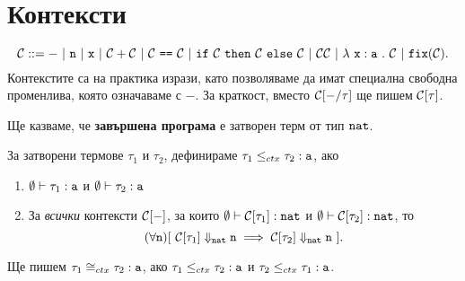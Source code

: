 \section{Контексти}\label{pcf:sect:context}

\[\C ::= -\ |\ \vv{n}\ |\ \vv{x}\ |\ \C + \C\ |\ \C\ \vv{==}\ \C\ |\ \ifelse{\C}{\C}{\C}\ |\ \C\C\ |\ \lamb{x}{a}{\C}\ |\ \fix(\C).\]
Контекстите са на практика изрази, като позволяваме да имат специална свободна променлива, която означаваме с $-$.
За краткост, вместо $\mathcal{C}[-/\tau]$ ще пишем $\mathcal{C}[\tau]$.


Ще казваме, че {\bf завършена програма} е затворен терм от тип $\texttt{nat}$.


\begin{framed}
  \begin{definition}\label{df:context:equivalence}
    За затворени термове $\tau_1$ и $\tau_2$, дефинираме
    $\tau_1 \leq_{ctx} \tau_2 : \texttt{a}$, ако
    \begin{enumerate}[1)]
    \item
      $\emptyset \vdash \tau_1 : \texttt{a}$ и $\emptyset \vdash \tau_2 : \texttt{a}$
    \item
      За \emph{всички} контексти $\mathcal{C}[-]$, за които $\emptyset \vdash \mathcal{C}[\tau_1] : \texttt{nat}$ и $\emptyset \vdash \mathcal{C}[\tau_2] : \texttt{nat}$, то
      \[(\forall \vv{n})[\ \C[\tau_1] \Downarrow_{\nat} \vv{n} \implies \C[\tau_2] \Downarrow_{\nat} \vv{n}\ ].\]
    \end{enumerate}
    Ще пишем $\tau_1 \cong_{ctx} \tau_2 : \texttt{a}$, ако
    $\tau_1 \leq_{ctx} \tau_2 : \texttt{a}$ и $\tau_2 \leq_{ctx} \tau_1 : \texttt{a}$.
  \end{definition}
\end{framed}

